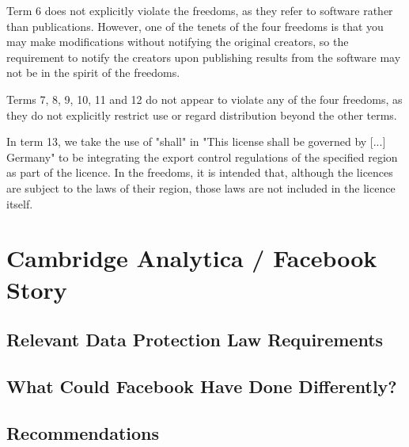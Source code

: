 \documentclass[a4wide, 11pt]{article}
\begin{document}
Term 6 does not explicitly violate the freedoms, as they refer to software rather than publications. However, one of the tenets of the four freedoms is that you may make modifications without notifying the original creators, so the requirement to notify the creators upon publishing results from the software may not be in the spirit of the freedoms.

Terms 7, 8, 9, 10, 11 and 12 do not appear to violate any of the four freedoms, as they do not explicitly restrict use or regard distribution beyond the other terms.

In term 13, we take the use of "shall" in "This license shall be governed by [...] Germany" to be integrating the export control regulations of the specified region as part of the licence. In the freedoms, it is intended that, although the licences are subject to the laws of their region, those laws are not included in the licence itself.

\section{Cambridge Analytica / Facebook Story}

\subsection{Relevant Data Protection Law Requirements}

\subsection{What Could Facebook Have Done Differently?}

\subsection{Recommendations}
\end{document}
